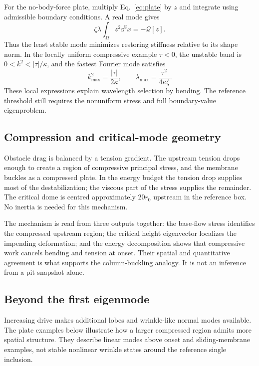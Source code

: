 For the no-body-force plate, multiply Eq.~\eqref{eq:plate} by $z$ and integrate using admissible boundary conditions. A real mode gives
\begin{equation}
\zeta\lambda\int_\Omega z^2\dd^2x=-\mathcal Q[z].
\label{eq:plate-energy-rate}
\end{equation}
Thus the least stable mode minimizes restoring stiffness relative to its shape norm. In the locally uniform compressive example $\tau<0$, the unstable band is $0<k^2<|\tau|/\kappa$, and the fastest Fourier mode satisfies
\begin{equation}
k_{\max}^2=\frac{|\tau|}{2\kappa},\qquad
\lambda_{\max}=\frac{\tau^2}{4\kappa\zeta}.
\end{equation}
These local expressions explain wavelength selection by bending. The reference threshold still requires the nonuniform stress and full boundary-value eigenproblem.

\subsection{Compression and critical-mode geometry}


Obstacle drag is balanced by a tension gradient. The upstream tension drops enough to create a region of compressive principal stress, and the membrane buckles as a compressed plate. In the energy budget the tension drop supplies most of the destabilization; the viscous part of the stress supplies the remainder. The critical dome is centred approximately $20r_0$ upstream in the reference box. No inertia is needed for this mechanism.


The mechanism is read from three outputs together: the base-flow stress identifies the compressed upstream region; the critical height eigenvector localizes the impending deformation; and the energy decomposition shows that compressive work cancels bending and tension at onset. Their spatial and quantitative agreement is what supports the column-buckling analogy. It is not an inference from a pit snapshot alone.


\subsection{Beyond the first eigenmode}


Increasing drive makes additional lobes and wrinkle-like normal modes available. The plate examples below illustrate how a larger compressed region admits more spatial structure. They describe linear modes above onset and sliding-membrane examples, not stable nonlinear wrinkle states around the reference single inclusion.


